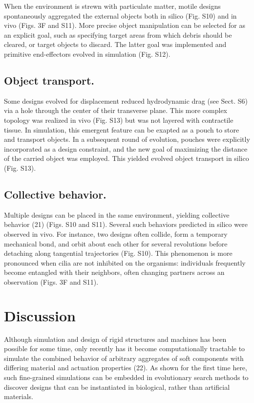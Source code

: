 When the environment is strewn with particulate matter, motile designs spontaneously aggregated the external objects both in silico (Fig. S10) and in vivo (Figs. 3F and S11). More precise object manipulation can be selected for as an explicit goal, such as specifying target areas from which debris should be cleared, or target objects to discard. The latter goal was implemented and primitive end-effectors evolved in simulation (Fig. S12).

\subsection*{Object transport.} 

Some designs evolved for displacement reduced hydrodynamic drag (see Sect. S6) via a hole through the center of their transverse plane. This more complex topology was realized in vivo (Fig. S13) but was not layered with contractile tissue. In simulation, this emergent feature can be exapted as a pouch to store and transport objects. In a subsequent round of evolution, pouches were explicitly incorporated as a design constraint, and the new goal of maximizing the distance of the carried object was employed. This yielded evolved object transport in silico (Fig. S13).

\subsection*{Collective behavior.}  

Multiple designs can be placed in the same environment, yielding collective behavior (21) (Figs. S10 and S11). Several such behaviors predicted in silico were observed in vivo. For instance, two designs often collide, form a temporary mechanical bond, and orbit about each other for several revolutions before detaching along tangential trajectories (Fig. S10). This phenomenon is more pronounced when cilia are not inhibited on the organisms: individuals frequently become entangled with their neighbors, often changing partners across an observation (Figs. 3F and S11).

\section{Discussion}

Although simulation and design of rigid structures and machines has been possible for some time, only recently has it become computationally tractable to simulate the combined behavior of arbitrary aggregates of soft components with differing material and actuation properties (22). As shown for the first time here, such fine-grained simulations can be embedded in evolutionary search methods to discover designs that can be instantiated in biological, rather than artificial materials. 


